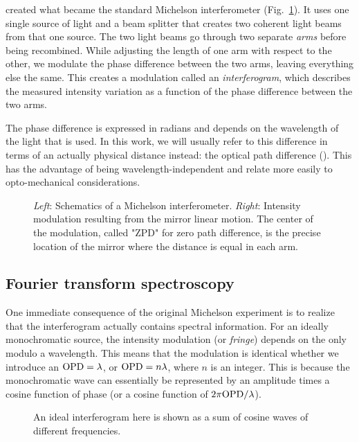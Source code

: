 \citet{Michelson:1887wc} created what became the standard Michelson interferometer (Fig.~\ref{fig:michelson}). It uses one single source of light and a beam splitter that creates two coherent light beams from that one source. The two light beams go through two separate \textit{arms} before being recombined. While adjusting the length of one arm with respect to the other, we modulate the phase difference between the two arms, leaving everything else the same. This creates a modulation called an \textit{interferogram}, which describes the measured intensity variation as a function of the phase difference between the two arms.

The phase difference is expressed in radians and depends on the wavelength of the light that is used. In this work, we will usually refer to this difference in terms of an actually physical distance instead: the optical path difference (\OPD). This has the advantage of being wavelength-independent and relate more easily to opto-mechanical considerations.

\begin{figure}[!ht]
	\centering
	
	\caption[Michelson interferometer]{\textit{Left}: Schematics of a Michelson interferometer. \textit{Right}: Intensity modulation resulting from the mirror linear motion. The center of the modulation, called "ZPD" for zero path difference, is the precise location of the mirror where the distance is equal in each arm.}
	\label{fig:michelson}
    \end{figure}



\subsection{Fourier transform spectroscopy}

One immediate consequence of the original Michelson experiment is to realize that the interferogram actually contains spectral information. For an ideally monochromatic source, the intensity modulation (or \textit{fringe}) depends on the \OPD only modulo a wavelength. This means that the modulation is identical whether we introduce an $\textrm{OPD} = \lambda$, or $\textrm{OPD} = n\lambda$, where $n$ is an integer. This is because the monochromatic wave can essentially be represented by an amplitude times a cosine function of phase (or a cosine function of $2\pi\textrm{OPD}/\lambda$).

\begin{figure}[!ht]
	\centering
	
	\caption[Simple interferogram]{An ideal interferogram here is shown as a sum of cosine waves of different frequencies.}
	\label{fig:interferogram}
    \end{figure}


